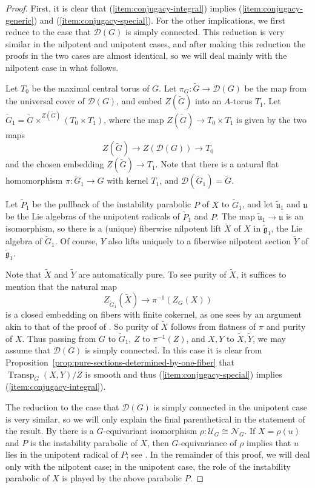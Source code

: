 \documentclass[11pt,reqno]{amsart}
\theoremstyle{definition}
\newcommand{\sD}{{\mathscr D}}
\newcommand{\sN}{{\mathscr N}}
\newcommand{\sU}{{\mathscr U}}
\newcommand{\fg}{\mathfrak{g}}
\newcommand{\fu}{\mathfrak{u}}
\DeclareMathOperator{\Transp}{Transp}
\begin{document}
\begin{proof}
First, it is clear that (\ref{item:conjugacy-integral}) implies (\ref{item:conjugacy-generic}) and (\ref{item:conjugacy-special}). For the other implications, we first reduce to the case that $\sD(G)$ is simply connected. This reduction is very similar in the nilpotent and unipotent cases, and after making this reduction the proofs in the two cases are almost identical, so we will deal mainly with the nilpotent case in what follows.\smallskip

Let $T_0$ be the maximal central torus of $G$. Let $\pi_G: \widetilde{G} \to \sD(G)$ be the map from the universal cover of $\sD(G)$, and embed $Z(\widetilde{G})$ into an $A$-torus $T_1$. Let $\widetilde{G}_1 = \widetilde{G} \times^{Z(\widetilde{G})} (T_0 \times T_1)$, where the map $Z(\widetilde{G}) \to T_0 \times T_1$ is given by the two maps
\[
Z(\widetilde{G}) \to Z(\sD(G)) \to T_0
\]
and the chosen embedding $Z(\widetilde{G}) \to T_1$. Note that there is a natural flat homomorphism $\pi: \widetilde{G}_1 \to G$ with kernel $T_1$, and $\sD(\widetilde{G}_1) = \widetilde{G}$. \smallskip

Let $\widetilde{P}_1$ be the pullback of the instability parabolic $P$ of $X$ to $\widetilde{G}_1$, and let $\widetilde{\fu}_1$ and $\fu$ be the Lie algebras of the unipotent radicals of $\widetilde{P}_1$ and $P$. The map $\widetilde{\fu}_1 \to \fu$ is an isomorphism, so there is a (unique) fiberwise nilpotent lift $\widetilde{X}$ of $X$ in $\widetilde{\fg}_1$, the Lie algebra of $\widetilde{G}_1$. Of course, $Y$ also lifts uniquely to a fiberwise nilpotent section $\widetilde{Y}$ of $\widetilde{\fg}_1$. \smallskip

Note that $\widetilde{X}$ and $\widetilde{Y}$ are automatically pure. To see purity of $\widetilde{X}$, it suffices to mention that the natural map
\[
Z_{\widetilde{G}_1}(\widetilde{X}) \to \pi^{-1}(Z_G(X))
\]
is a closed embedding on fibers with finite cokernel, as one sees by an argument akin to that of the proof of \cite[Lem.\ 3.3(2)]{Integral-Springer}. So purity of $\widetilde{X}$ follows from flatness of $\pi$ and purity of $X$. Thus passing from $G$ to $\widetilde{G}_1$, $Z$ to $\pi^{-1}(Z)$, and $X, Y$ to $\widetilde{X}, \widetilde{Y}$, we may assume that $\sD(G)$ is simply connected. In this case it is clear from Proposition~\ref{prop:pure-sections-determined-by-one-fiber} that $\Transp_G(X, Y)/Z$ is smooth and thus (\ref{item:conjugacy-special}) implies (\ref{item:conjugacy-integral}). \smallskip

The reduction to the case that $\sD(G)$ is simply connected in the unipotent case is very similar, so we will only explain the final parenthetical in the statement of the result. By \cite[Thm.\ 5.1]{Integral-Springer} there is a $G$-equivariant isomorphism $\rho: \sU_G \cong \sN_G$. If $X = \rho(u)$ and $P$ is the instability parabolic of $X$, then $G$-equivariance of $\rho$ implies that $u$ lies in the unipotent radical of $P$; see \cite[Rmk.\ 10]{Mcninch-optimal}. In the remainder of this proof, we will deal only with the nilpotent case; in the unipotent case, the role of the instability parabolic of $X$ is played by the above parabolic $P$. \smallskip


\end{proof}
\end{document}
